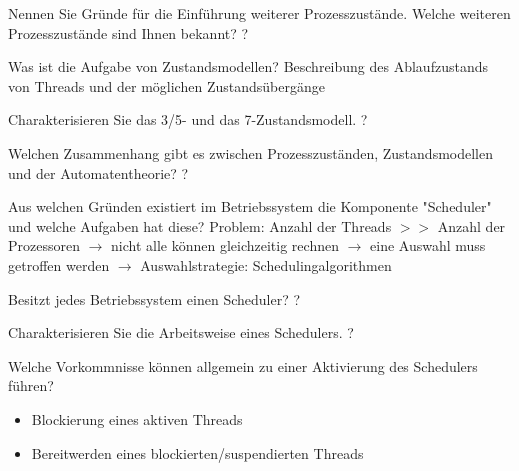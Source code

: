 \documentclass[avery5371]{flashcards}
\begin{document}
\begin{flashcard}{Nennen Sie Gründe für die Einführung weiterer Prozesszustände. Welche weiteren Prozesszustände sind Ihnen bekannt?}
    ?
\end{flashcard}

\begin{flashcard}{Was ist die Aufgabe von Zustandsmodellen?}
    Beschreibung des Ablaufzustands von Threads und der möglichen Zustandsübergänge
\end{flashcard}

\begin{flashcard}{Charakterisieren Sie das 3/5- und das 7-Zustandsmodell.}
    ?
\end{flashcard}

\begin{flashcard}{Welchen Zusammenhang gibt es zwischen Prozesszuständen, Zustandsmodellen und der Automatentheorie?}
    ?
\end{flashcard}

\begin{flashcard}[Scheduler]{Aus welchen Gründen existiert im Betriebssystem die Komponente "Scheduler" und welche Aufgaben hat diese?}
    Problem: Anzahl der Threads $>>$ Anzahl der Prozessoren $\rightarrow$ nicht alle können gleichzeitig rechnen $\rightarrow$ eine Auswahl muss getroffen werden $\rightarrow$ Auswahlstrategie: Schedulingalgorithmen
\end{flashcard}

\begin{flashcard}[Scheduler]{Besitzt jedes Betriebssystem einen Scheduler?}
    ?
\end{flashcard}

\begin{flashcard}[Scheduler]{Charakterisieren Sie die Arbeitsweise eines Schedulers.}
    ?
\end{flashcard}

\begin{flashcard}[Scheduler]{Welche Vorkommnisse können allgemein zu einer Aktivierung des Schedulers führen?}
    \begin{itemize}
        \item Blockierung eines aktiven Threads
        \item Bereitwerden eines blockierten/suspendierten Threads
    \end{itemize}
\end{flashcard}
\end{document}

